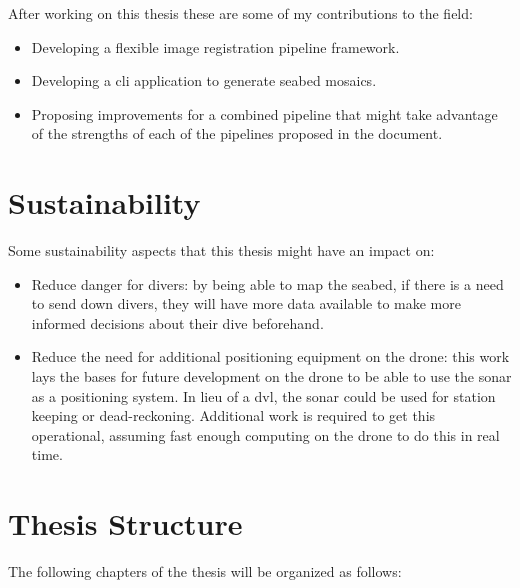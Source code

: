 After working on this thesis these are some of my contributions to the field:
\begin{itemize}
    \item Developing a flexible image registration pipeline framework.
    \item Developing a \acrshort{cli} application to generate seabed mosaics.
    \item Proposing improvements for a combined pipeline that might take advantage of the strengths of each of the pipelines proposed in the document. 
\end{itemize}


\section{Sustainability}

Some sustainability aspects that this thesis might have an impact on:

\begin{itemize}
    \item Reduce danger for divers: by being able to map the seabed, if there is a need to send down divers, they will have more data available to make more informed decisions about their dive beforehand.
    \item Reduce the need for additional positioning equipment on the drone: this work lays the bases for future development on the drone to be able to use the sonar as a positioning system. In lieu of a \acrshort{dvl}, the sonar could be used for station keeping or dead-reckoning. Additional work is required to get this operational, assuming fast enough computing on the drone to do this in real time. 
\end{itemize}


\section{Thesis Structure}

The following chapters of the thesis will be organized as follows:

